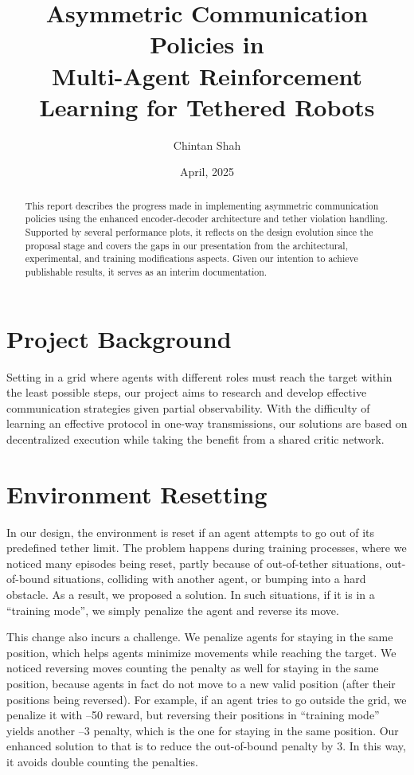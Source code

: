 \documentclass[a4paper,11pt]{article}
\title{Asymmetric Communication Policies in\\Multi-Agent Reinforcement Learning for Tethered Robots}
\author{Chintan Shah}
\date{\08 April, 2025}
\begin{document}
\maketitle
\clearpage

\begin{abstract}
This report describes the progress made in implementing asymmetric communication policies using the enhanced encoder-decoder architecture and tether violation handling. Supported by several performance plots, it reflects on the design evolution since the proposal stage and covers the gaps in our presentation from the architectural, experimental, and training modifications aspects. Given our intention to achieve publishable results, it serves as an interim documentation.
\end{abstract}

\section{Project Background}
Setting in a grid where agents with different roles must reach the target within the least possible steps, our project aims to research and develop effective communication strategies given partial observability. With the difficulty of learning an effective protocol in one-way transmissions, our solutions are based on decentralized execution while taking the benefit from a shared critic network.

\section{Environment Resetting}
In our design, the environment is reset if an agent attempts to go out of its predefined tether limit. The problem happens during training processes, where we noticed many episodes being reset, partly because of out-of-tether situations, out-of-bound situations, colliding with another agent, or bumping into a hard obstacle. As a result, we proposed a solution. In such situations, if it is in a “training mode”, we simply penalize the agent and reverse its move.

This change also incurs a challenge. We penalize agents for staying in the same position, which helps agents minimize movements while reaching the target. We noticed reversing moves counting the penalty as well for staying in the same position, because agents in fact do not move to a new valid position (after their positions being reversed). For example, if an agent tries to go outside the grid, we penalize it with –50 reward, but reversing their positions in “training mode” yields another –3 penalty, which is the one for staying in the same position. Our enhanced solution to that is to reduce the out-of-bound penalty by 3. In this way, it avoids double counting the penalties.
\end{document}
